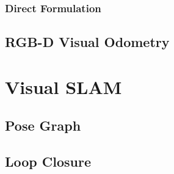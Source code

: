 \subsubsection{Direct Formulation}%
\label{ssub:direct-formulation}

\subsection{RGB-D Visual Odometry}%
\label{sub:rgbd-visual-odometry}

\section{Visual SLAM}%
\label{sec:v-slam}

\subsection{Pose Graph}%
\label{sub:pose-graph}

\subsection{Loop Closure}%
\label{sub:loop-closure}
